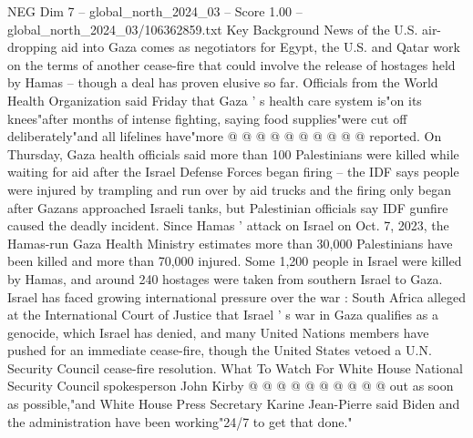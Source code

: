 \begin{textsample}{NEG Dim 7 – global\_north\_2024\_03 – Score 1.00 – global\_north\_2024\_03/106362859.txt}
Key Background News of the U.S. air-dropping aid into Gaza comes as negotiators for Egypt, the U.S. and Qatar work on the terms of another cease-fire that could involve the release of hostages held by Hamas -- though a deal has proven elusive so far.
Officials from the World Health Organization said Friday that Gaza ' s health care system is"on its knees"after months of intense fighting, saying food supplies"were cut off deliberately"and all lifelines have"more @ @ @ @ @ @ @ @ @ @ reported.
On Thursday, Gaza health officials said more than 100 Palestinians were killed while waiting for aid after the Israel Defense Forces began firing -- the IDF says people were injured by trampling and run over by aid trucks and the firing only began after Gazans approached Israeli tanks, but Palestinian officials say IDF gunfire caused the deadly incident.
Since Hamas ' attack on Israel on Oct. 7, 2023, the Hamas-run Gaza Health Ministry estimates more than 30,000 Palestinians have been killed and more than 70,000 injured.
Some 1,200 people in Israel were killed by Hamas, and around 240 hostages were taken from southern Israel to Gaza.
Israel has faced growing international pressure over the war : South Africa alleged at the International Court of Justice that Israel ' s war in Gaza qualifies as a genocide, which Israel has denied, and many United Nations members have pushed for an immediate cease-fire, though the United States vetoed a U.N.
Security Council cease-fire resolution.
What To Watch For White House National Security Council spokesperson John Kirby @ @ @ @ @ @ @ @ @ @ out as soon as possible,"and White House Press Secretary Karine Jean-Pierre said Biden and the administration have been working"24/7 to get that done."

\end{textsample}
